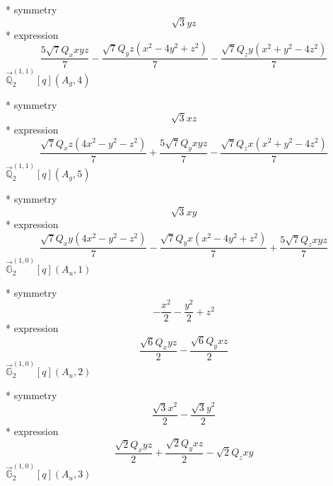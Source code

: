 \documentclass[fleqn,8pt]{jsarticle}
\begin{document}
\noindent\quad ** symmetry
\begin{dmath*}
\sqrt{3} y z
\end{dmath*}
\noindent\quad ** expression
\begin{dmath*}
\frac{5 \sqrt{7} Q_{x} x y z}{7} - \frac{\sqrt{7} Q_{y} z \left(x^{2} - 4 y^{2} + z^{2}\right)}{7} - \frac{\sqrt{7} Q_{z} y \left(x^{2} + y^{2} - 4 z^{2}\right)}{7}
\end{dmath*}
\noindent\quad $\vec{\mathbb{Q}}_{2}^{(1,1)}[q](A_{g},4)$

\noindent\quad ** symmetry
\begin{dmath*}
\sqrt{3} x z
\end{dmath*}
\noindent\quad ** expression
\begin{dmath*}
\frac{\sqrt{7} Q_{x} z \left(4 x^{2} - y^{2} - z^{2}\right)}{7} + \frac{5 \sqrt{7} Q_{y} x y z}{7} - \frac{\sqrt{7} Q_{z} x \left(x^{2} + y^{2} - 4 z^{2}\right)}{7}
\end{dmath*}
\noindent\quad $\vec{\mathbb{Q}}_{2}^{(1,1)}[q](A_{g},5)$

\noindent\quad ** symmetry
\begin{dmath*}
\sqrt{3} x y
\end{dmath*}
\noindent\quad ** expression
\begin{dmath*}
\frac{\sqrt{7} Q_{x} y \left(4 x^{2} - y^{2} - z^{2}\right)}{7} - \frac{\sqrt{7} Q_{y} x \left(x^{2} - 4 y^{2} + z^{2}\right)}{7} + \frac{5 \sqrt{7} Q_{z} x y z}{7}
\end{dmath*}
\noindent\quad $\vec{\mathbb{G}}_{2}^{(1,0)}[q](A_{u},1)$

\noindent\quad ** symmetry
\begin{dmath*}
- \frac{x^{2}}{2} - \frac{y^{2}}{2} + z^{2}
\end{dmath*}
\noindent\quad ** expression
\begin{dmath*}
\frac{\sqrt{6} Q_{x} y z}{2} - \frac{\sqrt{6} Q_{y} x z}{2}
\end{dmath*}
\noindent\quad $\vec{\mathbb{G}}_{2}^{(1,0)}[q](A_{u},2)$

\noindent\quad ** symmetry
\begin{dmath*}
\frac{\sqrt{3} x^{2}}{2} - \frac{\sqrt{3} y^{2}}{2}
\end{dmath*}
\noindent\quad ** expression
\begin{dmath*}
\frac{\sqrt{2} Q_{x} y z}{2} + \frac{\sqrt{2} Q_{y} x z}{2} - \sqrt{2} Q_{z} x y
\end{dmath*}
\noindent\quad $\vec{\mathbb{G}}_{2}^{(1,0)}[q](A_{u},3)$
\end{document}
